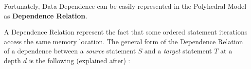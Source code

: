 \documentclass[paper=a4, fontsize=11pt]{scrartcl}
\numberwithin{equation}{section}        %
\numberwithin{figure}{section}          %
\numberwithin{table}{section}               %
\begin{document}
        Fortunately, Data Dependence can be easily represented in the Polyhedral Model as
        \textbf{Dependence Relation}.

        A Dependence Relation represent the fact that some ordered statement iterations
        access the same memory location. The general form of the Dependence Relation of
        a dependence between a \textit{source} statement $S$ and a \textit{target}
        statement $T$ at a depth $d$ is the following (explained after) :

        \begin{center}
\end{center}
\end{document}
